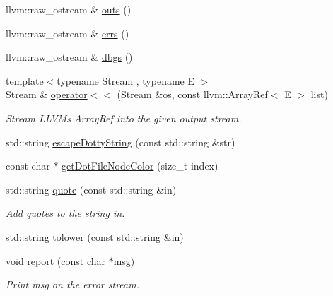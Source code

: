 \begin{DoxyCompactItemize}
llvm\+::raw\+\_\+ostream \& \hyperlink{namespaceglow_ae095c93d366edde27fb624fe8963e2d7}{outs} ()
\item 
llvm\+::raw\+\_\+ostream \& \hyperlink{namespaceglow_ad5afe057375ea161648698052cdeef25}{errs} ()
\item 
llvm\+::raw\+\_\+ostream \& \hyperlink{namespaceglow_a64763ac9b2b790fea832124d0b2d401a}{dbgs} ()
\item 
\mbox{\label{namespaceglow_a3149373d4dc6e9cf35f07ce89806adb2}} 
{\footnotesize template$<$typename Stream , typename E $>$ }\\Stream \& \hyperlink{namespaceglow_a3149373d4dc6e9cf35f07ce89806adb2}{operator$<$$<$} (Stream \&os, const llvm\+::\+Array\+Ref$<$ E $>$ list)
\begin{DoxyCompactList}\small\item\em Stream L\+L\+VM\textquotesingle{}s Array\+Ref into the given output stream. \end{DoxyCompactList}\item 
std\+::string \hyperlink{namespaceglow_a0c9f98855ca17db059deb4688e051e61}{escape\+Dotty\+String} (const std\+::string \&str)
\item 
const char $\ast$ \hyperlink{namespaceglow_abdedf715e997af0b1a4ad4b1882bed49}{get\+Dot\+File\+Node\+Color} (size\+\_\+t index)
\item 
\mbox{\label{namespaceglow_a321c329e831eeefea18601ae9ce56f00}} 
std\+::string \hyperlink{namespaceglow_a321c329e831eeefea18601ae9ce56f00}{quote} (const std\+::string \&in)
\begin{DoxyCompactList}\small\item\em Add quotes to the string {\ttfamily in}. \end{DoxyCompactList}\item 
std\+::string \hyperlink{namespaceglow_a697c3d30b72e51fbe7d1a027a77f530c}{tolower} (const std\+::string \&in)
\item 
\mbox{\label{namespaceglow_a9d164b45d9fb735f448cd7985bcdf203}} 
void \hyperlink{namespaceglow_a9d164b45d9fb735f448cd7985bcdf203}{report} (const char $\ast$msg)
\begin{DoxyCompactList}\small\item\em Print {\ttfamily msg} on the error stream. \end{DoxyCompactList}\item 
\mbox{\label{namespaceglow_ab1b24dfac70824545414756a61885717}} 

\end{DoxyCompactItemize}
